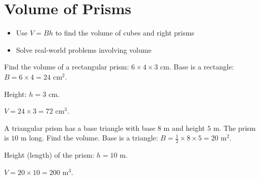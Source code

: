 \section{Volume of Prisms}

\begin{stepGoal}
\begin{itemize}
    \item Use $V = Bh$ to find the volume of cubes and right prisms
    \item Solve real-world problems involving volume
\end{itemize}
\end{stepGoal}

\begin{stepVocabBox}
\end{stepVocabBox}

\begin{stepsCard}
\end{stepsCard}

\begin{stepExample}{Find the volume of a rectangular prism: $6 \times 4 \times 3$ cm.}
     Base is a rectangle: $B = 6 \times 4 = 24$ cm$^{2}$.

     Height: $h = 3$ cm.

     $V = 24 \times 3 = 72$ cm$^{3}$.
\end{stepExample}

\begin{stepExample}{A triangular prism has a base triangle with base $8$ m and height $5$ m. The prism is $10$ m long. Find the volume.}
     Base is a triangle: $B = \frac{1}{2} \times 8 \times 5 = 20$ m$^{2}$.

     Height (length) of the prism: $h = 10$ m.

     $V = 20 \times 10 = 200$ m$^{3}$.
\end{stepExample}

